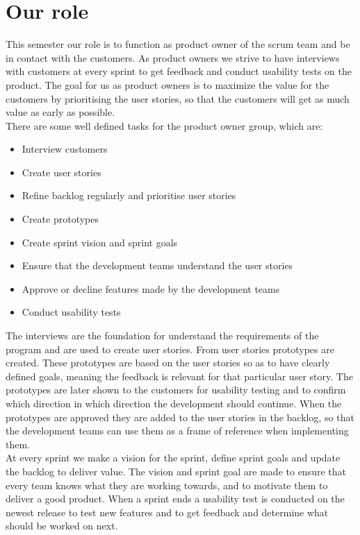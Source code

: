 \section{Our role}
This semester our role is to function as product owner of the scrum team and be in contact with the customers.
As product owners we strive to have interviews with customers at every sprint to get feedback and conduct usability tests on the product. 
The goal for us as product owners is to maximize the value for the customers by prioritising the user stories, so that the customers will get as much value as early as possible.
\\
There are some well defined tasks for the product owner group, which are:
\begin{itemize}
    \item Interview customers
    \item Create user stories    
    \item Refine backlog regularly and prioritise user stories
    \item Create prototypes
    \item Create sprint vision and sprint goals
    \item Ensure that the development teams understand the user stories
    \item Approve or decline features made by the development teams
    \item Conduct usability tests
\end{itemize}
\noindent
The interviews are the foundation for understand the requirements of the program and are used to create user stories. 
From user stories prototypes are created.
These prototypes are based on the user stories so as to have clearly defined goals, meaning the feedback is relevant for that particular user story.
The prototypes are later shown to the customers for usability testing and to confirm which direction in which direction the development should continue.
When the prototypes are approved they are added to the user stories in the backlog, so that the development teams can use them as a frame of reference when implementing them.
\\
At every sprint we make a vision for the sprint, define sprint goals and update the backlog to deliver value. 
The vision and sprint goal are made to ensure that every team knows what they are working towards, and to motivate them to deliver a good product.
When a sprint ends a usability test is conducted on the newest release to test new features and to get feedback and determine what should be worked on next.
